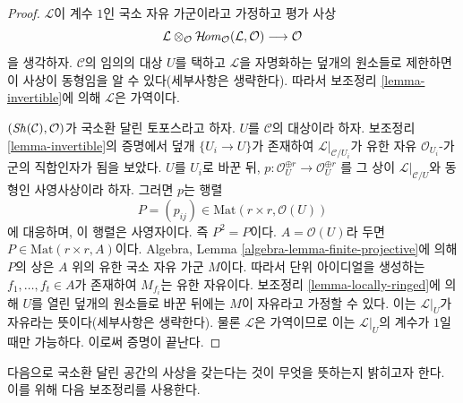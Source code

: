 \begin{proof}
$\mathcal{L}$이 계수 $1$인 국소 자유 가군이라고 가정하고 평가 사상
$$
\mathcal{L} \otimes_\mathcal{O}
\mathop{\mathcal{H}\!\mathit{om}}\nolimits_\mathcal{O}(\mathcal{L}, \mathcal{O})
\longrightarrow \mathcal{O}
$$
을 생각하자. $\mathcal{C}$의 임의의 대상 $U$를 택하고
$\mathcal{L}$을 자명화하는 덮개의 원소들로 제한하면 이 사상이
동형임을 알 수 있다(세부사항은 생략한다). 따라서 보조정리
\ref{lemma-invertible}에 의해 $\mathcal{L}$은 가역이다.

\medskip\noindent
$(\mathop{\mathit{Sh}}\nolimits(\mathcal{C}), \mathcal{O})$가 국소환 달린 토포스라고 하자.
$U$를 $\mathcal{C}$의 대상이라 하자. 보조정리 \ref{lemma-invertible}의
증명에서 덮개 $\{U_i \to U\}$가 존재하여
$\mathcal{L}|_{\mathcal{C}/U_i}$가 유한 자유 $\mathcal{O}_{U_i}$-가군의
직합인자가 됨을 보았다. $U$를 $U_i$로 바꾼 뒤,
$p : \mathcal{O}_U^{\oplus r} \to \mathcal{O}_U^{\oplus r}$
를 그 상이 $\mathcal{L}|_{\mathcal{C}/U}$와 동형인 사영사상이라 하자.
그러면 $p$는 행렬
$$
P = (p_{ij}) \in \text{Mat}(r \times r, \mathcal{O}(U))
$$
에 대응하며, 이 행렬은 사영자이다. 즉 $P^2  = P$이다.
$A = \mathcal{O}(U)$라 두면 $P \in \text{Mat}(r \times r, A)$이다.
Algebra, Lemma \ref{algebra-lemma-finite-projective}에 의해 $P$의 상은
$A$ 위의 유한 국소 자유 가군 $M$이다. 따라서 단위 아이디얼을 생성하는
$f_1, \ldots, f_t \in A$가 존재하여 $M_{f_i}$는 유한 자유이다.
보조정리 \ref{lemma-locally-ringed}에 의해 $U$를 열린 덮개의 원소들로
바꾼 뒤에는 $M$이 자유라고 가정할 수 있다. 이는 $\mathcal{L}|_U$가
자유라는 뜻이다(세부사항은 생략한다). 물론 $\mathcal{L}$은 가역이므로
이는 $\mathcal{L}|_U$의 계수가 $1$일 때만 가능하다. 이로써 증명이 끝난다.
\end{proof}

\noindent
다음으로 국소환 달린 공간의 사상을 갖는다는 것이 무엇을 뜻하는지
밝히고자 한다. 이를 위해 다음 보조정리를 사용한다.

